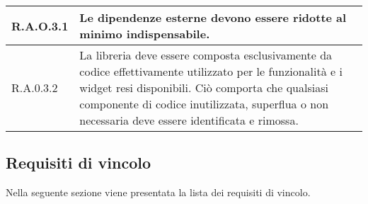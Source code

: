 \begin{center}
\begin{longtable}{|p{2.5cm}|p{10cm}|}
        \hline
        R.A.O.3.1          & Le dipendenze esterne devono essere ridotte al minimo indispensabile.                                                        \\
        \hline
        R.A.0.3.2          & La libreria deve essere composta esclusivamente da codice effettivamente utilizzato per le funzionalità e i widget resi
        disponibili. Ciò comporta che qualsiasi componente di codice inutilizzata, superflua o non necessaria deve essere identificata e rimossa.         \\
    \end{longtable}
    \label{tab:requisiti_qualitativi}
\end{center}

\subsection{Requisiti di vincolo}
Nella seguente sezione viene presentata la lista dei requisiti di vincolo.

